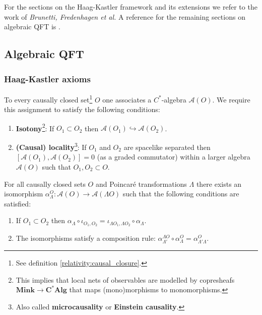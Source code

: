 \chapter{}

    For the sections on the Haag-Kastler framework and its extensions we refer to the work of \textit{Brunetti, Fredenhagen et al.} A reference for the remaining sections on algebraic QFT is \cite{baez_aqft}.

\section{Algebraic QFT}
\subsection{Haag-Kastler axioms}

    \begin{axiom}\label{qft:microcausality}
        To every causally closed set\footnote{See definition \ref{relativity:causal_closure}.} $O$ one associates a $C^*$-algebra $\mathcal{A}(O)$. We require this assignment to satisfy the following conditions:
        \begin{enumerate}
            \item \textbf{Isotony}\footnote{This implies that local nets of observables are modelled by copresheafs $\mathbf{Mink}\rightarrow\mathbf{C^*Alg}$ that maps (mono)morphisms to monomorphisms.}: If $O_1\subset O_2$ then $\mathcal{A}(O_1)\hookrightarrow\mathcal{A}(O_2)$.
            \item \textbf{(Causal) locality}\footnote{Also called \textbf{microcausality} or \textbf{Einstein causality}.}: If $O_1$ and $O_2$ are spacelike separated then $[\mathcal{A}(O_1), \mathcal{A}(O_2)] = 0$ (as a graded commutator) within a larger algebra $\mathcal{A}(O)$ such that $O_1, O_2\subset O$.
        \end{enumerate}
    \end{axiom}

    \begin{axiom}
        For all causally closed sets $O$ and Poincar\'e transformations $\Lambda$ there exists an isomorphism $\alpha^O_\Lambda:\mathcal{A}(O)\rightarrow\mathcal{A}(\Lambda O)$ such that the following conditions are satisfied:
        \begin{enumerate}
            \item If $O_1\subset O_2$ then $\alpha_\Lambda\circ\iota_{O_1,O_2} = \iota_{\Lambda O_1, \Lambda O_2}\circ\alpha_\Lambda$.
            \item The isomorphisms satisfy a composition rule: $\alpha^{\Lambda O}_{\Lambda'}\circ\alpha^O_\Lambda = \alpha^O_{\Lambda'\Lambda}$.
        \end{enumerate}
    \end{axiom}

